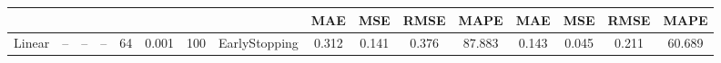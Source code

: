 \begin{table}[h!]
{\begin{tabular}{cccccccccccccccc}
                                                                              &                                                                                 &                                                                                  &                                                                                &                                                                       &                                                                          &                         &                                                                                & MAE                                                                       & MSE                                                                       & RMSE                                                                      & MAPE                                                                            & MAE                                                                       & MSE                                                                       & RMSE                                                                      & MAPE                                                                            \\ \hline
Linear                                                                        & --                                                                             & --                                                                              & --                                                                            & 64                                                                    & 0.001                                                                    & 100                     & EarlyStopping                                                                  & 0.312                                                                     & 0.141                                                                     & 0.376                                                                     & 87.883                                                                          & 0.143                                                                     & 0.045                                                                     & 0.211                                                                     & 60.689                                                                          \\ \hline

\end{tabular}}
\end{table}
